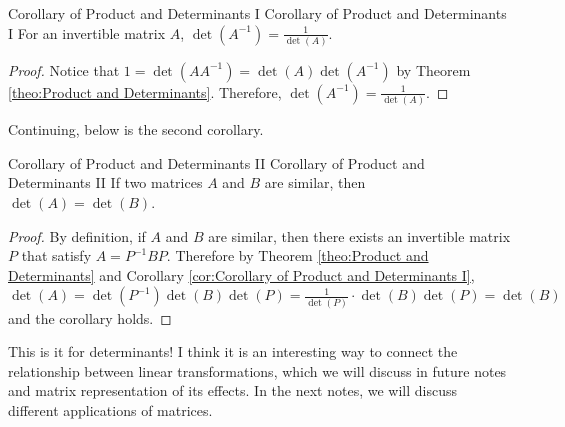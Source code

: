 \documentclass[../main.tex]{subfiles}
\begin{document}
\begin{corollary}{Corollary of Product and Determinants I}
{Corollary of Product and Determinants I}
For an invertible matrix $A$, $\det(A^{-1}) = \frac{1}{\det(A)}$.
\end{corollary}
\begin{proof}
Notice that $1 = \det(AA^{-1}) = \det(A) \det(A^{-1})$ by Theorem
\ref{theo:Product and Determinants}. Therefore, $\det(A^{-1}) =
\frac{1}{\det(A)}$.
\end{proof}

Continuing, below is the second corollary.

\begin{corollary}{Corollary of Product and Determinants II}
{Corollary of Product and Determinants II}
If two matrices $A$ and $B$ are similar, then $\det(A) = \det(B)$.
\end{corollary}
\begin{proof}
By definition, if $A$ and $B$ are similar, then there exists an
invertible matrix $P$ that satisfy $A = P^{-1} B P$. Therefore
by Theorem \ref{theo:Product and Determinants} and Corollary
\ref{cor:Corollary of Product and Determinants I}, $\det(A) =
\det(P^{-1}) \det(B) \det(P) = \frac{1}{\det(P)} \cdot \det(B) \det(P)
= \det(B)$ and the corollary holds.
\end{proof}

This is it for determinants! I think it is an interesting way to
connect the relationship between linear transformations, which
we will discuss in future notes and matrix representation of its
effects. In the next notes, we will discuss different applications
of matrices.
\end{document}
